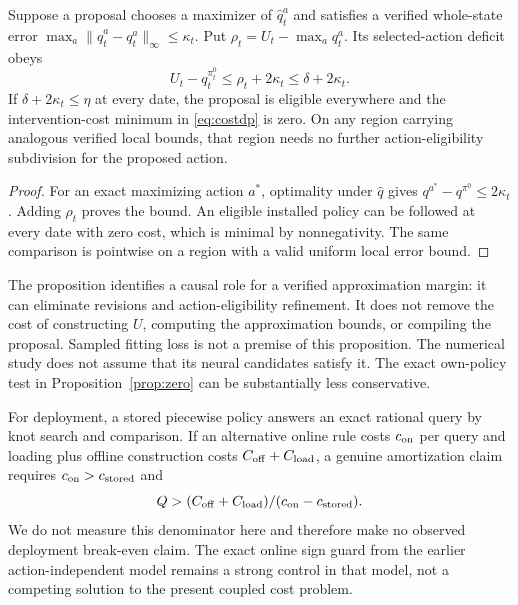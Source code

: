 \begin{proposition}\label{prop:proposal}
Suppose a proposal chooses a maximizer of $\widehat q_t^a$ and satisfies a verified whole-state error $\max_a\|\widehat q_t^a-q_t^a\|_\infty\le\kappa_t$. Put $\rho_t=U_t-\max_aq_t^a$. Its selected-action deficit obeys
\begin{equation}
 U_t-q_t^{\pi_t^0}\le\rho_t+2\kappa_t\le\delta+2\kappa_t.
\end{equation}
If $\delta+2\kappa_t\le\eta$ at every date, the proposal is eligible everywhere and the intervention-cost minimum in \eqref{eq:costdp} is zero. On any region carrying analogous verified local bounds, that region needs no further action-eligibility subdivision for the proposed action.
\end{proposition}
\begin{proof}
For an exact maximizing action $a^*$, optimality under $\widehat q$ gives $q^{a^*}-q^{\pi^0}\le2\kappa_t$. Adding $\rho_t$ proves the bound. An eligible installed policy can be followed at every date with zero cost, which is minimal by nonnegativity. The same comparison is pointwise on a region with a valid uniform local error bound.\end{proof}

The proposition identifies a causal role for a verified approximation margin: it can eliminate revisions and action-eligibility refinement. It does not remove the cost of constructing $U$, computing the approximation bounds, or compiling the proposal. Sampled fitting loss is not a premise of this proposition. The numerical study does not assume that its neural candidates satisfy it. The exact own-policy test in Proposition~\ref{prop:zero} can be substantially less conservative.

For deployment, a stored piecewise policy answers an exact rational query by knot search and comparison. If an alternative online rule costs $c_{\rm on}$ per query and loading plus offline construction costs $C_{\rm off}+C_{\rm load}$, a genuine amortization claim requires $c_{\rm on}>c_{\rm stored}$ and
\begin{equation}
 Q>(C_{\rm off}+C_{\rm load})/(c_{\rm on}-c_{\rm stored}).
\end{equation}
We do not measure this denominator here and therefore make no observed deployment break-even claim. The exact online sign guard from the earlier action-independent model remains a strong control in that model, not a competing solution to the present coupled cost problem.

